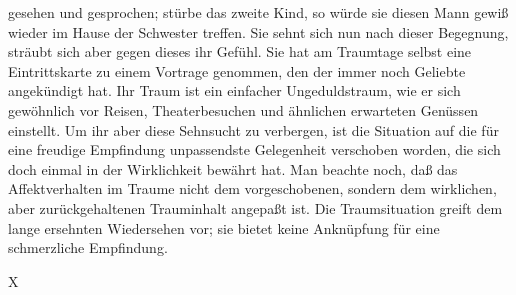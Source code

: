 \documentclass{article}
\begin{document}
         
            
            
            
        \pstart
        gesehen und gesprochen; stürbe das zweite Kind, so würde sie diesen
               Mann gewiß wieder im Hause der Schwester treffen. Sie sehnt sich nun nach dieser
               Begegnung, sträubt sich aber gegen dieses ihr Gefühl. Sie hat am Traumtage
               selbst eine Eintrittskarte zu einem Vortrage genommen, den der immer noch
               Geliebte angekündigt hat. Ihr Traum ist ein einfacher Ungeduldstraum,
               wie er sich gewöhnlich vor Reisen, Theaterbesuchen und ähnlichen erwarteten
               Genüssen einstellt. Um ihr aber diese Sehnsucht zu verbergen, ist die Situation
               auf die für eine freudige Empfindung unpassendste Gelegenheit verschoben worden,
               die sich doch einmal in der Wirklichkeit bewährt hat. Man beachte
               noch, daß das Affektverhalten im Traume nicht dem vorgeschobenen, sondern
               dem wirklichen, aber zurückgehaltenen Trauminhalt angepaßt ist. Die
               Traumsituation greift dem lange ersehnten Wiedersehen vor; sie bietet keine
               Anknüpfung für eine schmerzliche Empfindung.
        \pend
    
         
            
            
            
        \pstart
        X
        \pend
    
\end{document}
